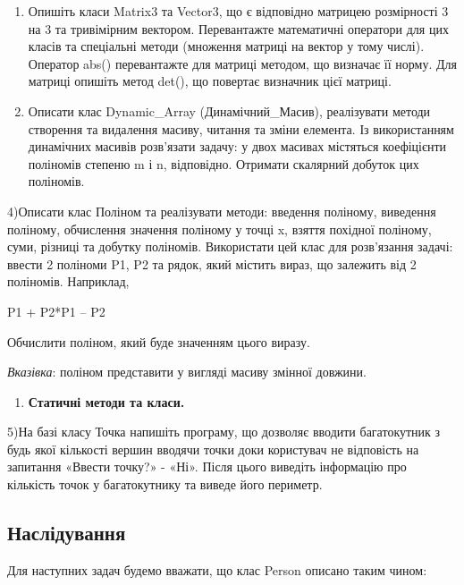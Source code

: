 \documentclass[]{article}
\begin{document}
\begin{enumerate}
\def\labelenumi{\arabic{enumi})}
\item
  Опишіть класи Matrix3 та Vector3, що є відповідно матрицею розмірності
  3 на 3 та тривімірним вектором. Перевантажте математичні оператори для
  цих класів та спеціальні методи (множення матриці на вектор у тому
  числі). Оператор abs() перевантажте для матриці методом, що визначає
  її норму. Для матриці опишіть метод det(), що повертає визначник цієї
  матриці.
\item
  Описати клас Dynamic\_Array (Динамічний\_Масив), реалізувати методи
  створення та видалення масиву, читання та зміни елемента. Із
  використанням динамічних масивів розв'язати задачу: у двох масивах
  містяться коефіцієнти поліномів степеню m і n, відповідно. Отримати
  скалярний добуток цих поліномів.
\end{enumerate}

\protect\hypertarget{__DdeLink__7879_2123939799}{}{}4)Описати клас
Поліном та реалізувати методи: введення поліному, виведення поліному,
обчислення значення поліному у точці x, взяття похідної поліному, суми,
різниці та добутку поліномів. Використати цей клас для розв'язання
задачі: ввести 2 поліноми P1, P2 та рядок, який містить вираз, що
залежить від 2 поліномів. Наприклад,

P1 + P2*P1 -- P2

Обчислити поліном, який буде значенням цього виразу.

\emph{Вказівка}: поліном представити у вигляді масиву змінної довжини.

\begin{enumerate}
\def\labelenumi{\arabic{enumi}.}
\setcounter{enumi}{1}
\item
  \textbf{Статичні методи та класи. }
\end{enumerate}

5)На базі класу Точка напишіть програму, що дозволяє вводити
багатокутник з будь якої кількості вершин вводячи точки доки користувач
не відповість на запитання «Ввести точку?» - «Ні». Після цього виведіть
інформацію про кількість точок у багатокутнику та виведе його периметр.

\subsection{Наслідування}\label{ux43dux430ux441ux43bux456ux434ux443ux432ux430ux43dux43dux44f}

Для наступних задач будемо вважати, що клас Person описано таким чином:
\end{document}
